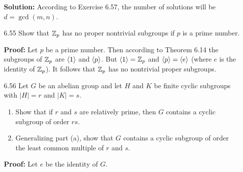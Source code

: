 \begin{enumerate}
      \textbf{Solution:} According to Exercise 6.57, the number of solutions
      will be $d = \gcd(m, n)$.
   \item[6.55] Show that $\mathbb{Z}_p$ has no proper nontrivial subgroups if $p$ is a
               prime number.
               
      \textbf{Proof:} Let $p$ be a prime number. Then according to Theorem 6.14
      the subgroups of $\mathbb{Z}_p$ are $\langle 1 \rangle$ and $\langle p \rangle$. But $\langle 1 \rangle = \mathbb{Z}_p$
      and $\langle p \rangle = \langle e \rangle$ (where $e$ is the identity of $\mathbb{Z}_p$). It follows
      that $\mathbb{Z}_p$ has no nontrivial proper subgroups.
   \item[6.56] Let $G$ be an abelian group and let $H$ and $K$ be finite cyclic
               subgroups with $|H| = r$ and $|K| = s$.
               \begin{enumerate}
                  \item Show that if $r$ and $s$ are relatively prime, then $G$
                        contains a cyclic subgroup of order $rs$.
                  \item Generalizing part (a), show that $G$ contains a cyclic
                        subgroup of order the least common multiple of $r$ and
                        $s$.
               \end{enumerate}

      \textbf{Proof:} Let $e$ be the identity of $G$.


\end{enumerate}
